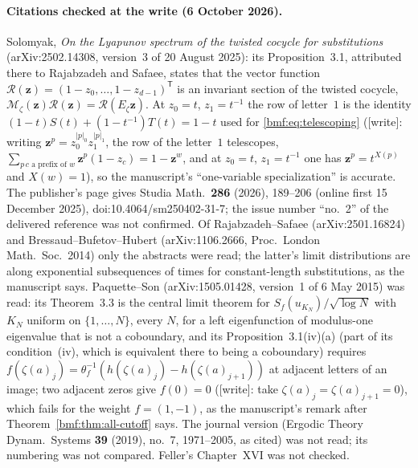 \documentclass[11pt]{article}
\numberwithin{equation}{section}
\theoremstyle{definition}
\theoremstyle{remark}
\newcommand{\abs}[1]{\lvert#1\rvert}
\begin{document}
\paragraph{Citations checked at the write (6 October 2026).}
Solomyak, \emph{On the Lyapunov spectrum of the twisted cocycle for
substitutions} (arXiv:2502.14308, version~3 of 20 August 2025): its
Proposition~3.1, attributed there to Rajabzadeh and Safaee, states that the
vector function $\mathcal R(\mathbf z)=(1-z_0,\dots,1-z_{d-1})^{\mathsf T}$
is an invariant section of the twisted cocycle,
$\mathcal M_\zeta(\mathbf z)\mathcal R(\mathbf z)=\mathcal R(E_\zeta\mathbf z)$.
At $z_0=t$, $z_1=t^{-1}$ the row of letter~$1$ is the identity
$(1-t)S(t)+(1-t^{-1})T(t)=1-t$ used for \eqref{bmf:eq:telescoping} ([write]: writing
$\mathbf z^{p}=z_0^{\abs p_0}z_1^{\abs p_1}$, the row of the letter~$1$
telescopes, $\sum_{p\,c\text{ a prefix of }w}\mathbf z^{p}(1-z_c)=1-\mathbf z^{w}$,
and at $z_0=t$, $z_1=t^{-1}$ one has $\mathbf z^{p}=t^{X(p)}$ and
$X(w)=1$), so the manuscript's ``one-variable specialization'' is
accurate. The
publisher's page gives Studia Math.\ \textbf{286} (2026), 189--206
(online first 15 December 2025), doi:10.4064/sm250402-31-7; the issue
number ``no.~2'' of the delivered reference was not confirmed. Of
Rajabzadeh--Safaee (arXiv:2501.16824) and Bressaud--Bufetov--Hubert
(arXiv:1106.2666, Proc.\ London Math.\ Soc.\ 2014) only the abstracts were
read; the latter's limit distributions are along exponential subsequences
of times for constant-length substitutions, as the manuscript says.
Paquette--Son (arXiv:1505.01428, version~1 of 6 May 2015) was read: its
Theorem~3.3 is the central limit theorem for $S_f(u_{K_N})/\sqrt{\log N}$
with $K_N$ uniform on $\{1,\dots,N\}$, every $N$, for a left eigenfunction
of modulus-one eigenvalue that is not a coboundary, and its
Proposition~3.1(iv)(a) (part of its condition~(iv), which is equivalent there to being a
coboundary) requires
$f(\zeta(a)_j)=\theta_f^{-1}(h(\zeta(a)_j)-h(\zeta(a)_{j+1}))$ at adjacent
letters of an image; two adjacent zeros give $f(0)=0$ ([write]: take $\zeta(a)_j=\zeta(a)_{j+1}=0$),
which fails for the weight $f=(1,-1)$, as the manuscript's remark after
Theorem~\ref{bmf:thm:all-cutoff} says. The journal version (Ergodic Theory
Dynam.\ Systems \textbf{39} (2019), no.~7, 1971--2005, as cited) was not
read; its numbering was not compared. Feller's Chapter~XVI was not checked.
\end{document}
